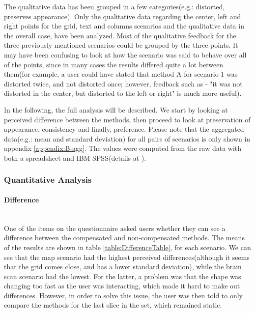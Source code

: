 \documentclass[]{article}
\begin{document}
The qualitative data has been grouped in a few categories(e.g.: distorted, preserves appearance). Only the qualitative data regarding the center, left and right points for the grid, text and columns scenarios and the qualitative data in the overall case, have been analyzed. Most of the qualitative feedback for the three previously mentioned scenarios could be grouped by the three points. It may have been confusing to look at how the scenario was said to behave over all of the points, since in many cases the results differed quite a lot between them(for example, a user could have stated that method A for scenario 1 was distorted twice, and not distorted once; however, feedback such as - "it was not distorted in the center, but distorted to the left or right" is much more useful).

In the following, the full analysis will be described. We start by looking at perceived difference between the methods, then proceed to look at preservation of appearance, consistency and finally, preference. Please note that the aggregated data(e.g.: mean and standard deviation) for all pairs of scenarios is only shown in appendix \ref{appendix:B-agg}. The values were computed from the raw data with both a spreadsheet and IBM SPSS(details at \cite{spss}).

\subsubsection{Quantitative Analysis}
\paragraph{Difference}\mbox{}\\

One of the items on the questionnaire asked users whether they can see a difference between the compensated and non-compensated methods. The means of the results are shown in table \ref{table:DifferenceTable}, for each scenario. We can see that the map scenario had the highest perceived differences(although it seems that the grid comes close, and has a lower standard deviation), while the brain scan scenario had the lowest. For the latter, a problem was that the shape was changing too fast as the user was interacting, which made it hard to make out differences. However, in order to solve this issue, the user was then told to only compare the methods for the last slice in the set, which remained static.

\end{document}
